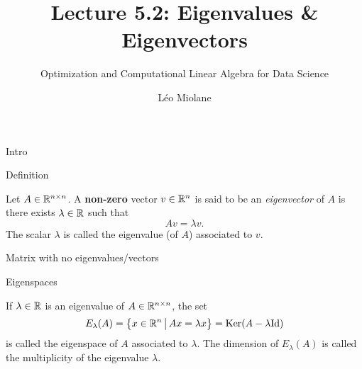 \documentclass{beamer}
\title{Lecture 5.2: Eigenvalues \& Eigenvectors}
\subtitle{Optimization and Computational Linear Algebra for Data Science}
\author{Léo Miolane}
\date{}
\begin{document}
\setcounter{showProgressBar}{0}
\setcounter{showSlideNumbers}{0}

\frame{\titlepage}
\setcounter{framenumber}{0}
\setcounter{showSlideNumbers}{1}

\begin{frame}[t]{Intro}
	\grid

\end{frame}

\begin{frame}[t]{Definition}
	\grid

	\vspace{-0.4cm}
	\begin{definition}\label{def:eigen}
		Let $A \in \mathbb{R}^{n \times n}$. A \textbf{non-zero} vector $v \in \mathbb{R}^n$ is said to be an \emph{eigenvector} of $A$ is there exists $\lambda \in \mathbb{R}$ such that
		$$
		A v = \lambda v.
		$$
		The scalar $\lambda$ is called the eigenvalue (of $A$) associated to $v$. 
	\end{definition}
\end{frame}

\begin{frame}[t]{Matrix with no eigenvalues/vectors}
	\grid

\end{frame}

\begin{frame}[t]{Eigenspaces}
	\grid

	\vspace{-0.4cm}
	\begin{definition}
		If $\lambda \in \mathbb{R}$ is an eigenvalue of $A \in \mathbb{R}^{n \times n}$, the set
		$$
		E_{\lambda}(A) = \big\{ x \in \mathbb{R}^n \, \big| \, Ax = \lambda x \big\} = {{\rm Ker}}(A-\lambda {{\rm Id}})
		$$
		is called the eigenspace of $A$ associated to $\lambda$. The dimension of $E_{\lambda}(A)$ is called the multiplicity of the eigenvalue $\lambda$.
	\end{definition}
\end{frame}
\end{document}
